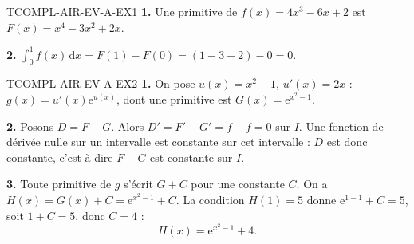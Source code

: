 \begin{corrige}{TCOMPL-AIR-EV-A-EX1}
\textbf{1.} Une primitive de $f(x)=4x^3-6x+2$ est $F(x) = x^4-3x^2+2x$.

\textbf{2.} $\displaystyle\int_0^1 f(x)\,\mathrm{d}x = F(1)-F(0) = (1-3+2)-0 = 0$.
\end{corrige}

\begin{corrige}{TCOMPL-AIR-EV-A-EX2}
\textbf{1.} On pose $u(x)=x^2-1$, $u'(x)=2x$ : $g(x)=u'(x)\mathrm{e}^{u(x)}$, dont une primitive est $G(x) = \mathrm{e}^{x^2-1}$.

\textbf{2.} Posons $D=F-G$. Alors $D'=F'-G'=f-f=0$ sur $I$. Une fonction de dérivée nulle sur un intervalle est constante sur cet intervalle : $D$ est donc constante, c'est-à-dire $F-G$ est constante sur $I$.

\textbf{3.} Toute primitive de $g$ s'écrit $G+C$ pour une constante $C$. On a $H(x)=G(x)+C=\mathrm{e}^{x^2-1}+C$. La condition $H(1)=5$ donne $\mathrm{e}^{1-1}+C=5$, soit $1+C=5$, donc $C=4$ :
\[
  H(x) = \mathrm{e}^{x^2-1} + 4.
\]
\end{corrige}
